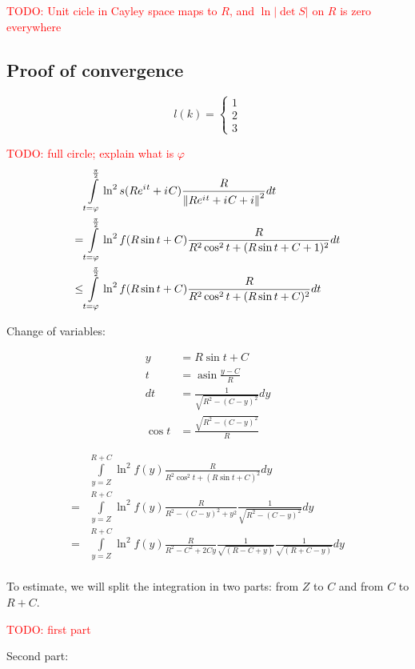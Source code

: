 \documentclass[12pt, a4paper]{article}
\newcommand{\abs}[1]{\left| #1 \right|}
\newcommand{\norm}[1]{\left\lVert #1 \right\rVert}
\newcommand{\eexp}[1]{e^{#1}}
\newcommand{\iu}{{i\mkern1mu}}
\renewcommand{\phi}{\varphi}
\newcommand{\todo}[1]{{\large \textcolor{red}{TODO: #1}}}
\DeclareMathOperator\asin{asin}
\begin{document}
\todo{Unit cicle in Cayley space maps to $R$, and $\ln\abs{\det S}$ on $R$ is zero everywhere}

\subsection*{Proof of convergence}

\[
l(k) =
\begin{cases}
1 \\
2 \\
3 
\end{cases}
\]


\todo{full circle; explain what is $\phi$}
\begin{align*}
    & \int\limits_{t = \phi}^{\frac{\pi}{2}} \ln^2 s(R \eexp{\iu t} + \iu C) \frac{R}{\norm{R \eexp{\iu t} + \iu C + i}^2} dt\\
=   & \int\limits_{t = \phi}^{\frac{\pi}{2}} \ln^2 f(R \sin t + C) \frac{R}{R^2 \cos^2 t + (R \sin t + C + 1)^2} dt\\
\le & \int\limits_{t = \phi}^{\frac{\pi}{2}} \ln^2 f(R \sin t + C) \frac{R}{R^2 \cos^2 t + (R \sin t + C)^2} dt\\
\end{align*}


Change of variables:

\begin{align*}
y &= R \sin t + C \\
t &= \asin \frac{y - C}{R} \\
dt &= \frac{1}{\sqrt{R^2 - (C - y)^2}} dy \\
\cos t &= \frac{\sqrt{R^2 - (C - y)^2}}{R}
\end{align*}


\begin{align*}
    & \int\limits_{y = Z}^{R + C} \ln^2 f(y) \frac{R}{R^2 \cos^2 t + (R \sin t + C)^2} dy \\
=   & \int\limits_{y = Z}^{R + C} \ln^2 f(y) \frac{R}{R^2 - (C - y)^2 + y^2} \frac{1}{\sqrt{R^2 - (C - y)^2}} dy\\
=   & \int\limits_{y = Z}^{R + C} \ln^2 f(y) \frac{R}{R^2 - C^2 + 2 C y} \frac{1}{\sqrt{(R - C + y)}} \frac{1}{\sqrt{(R + C - y)}} dy\\
\end{align*}

To estimate, we will split the integration in two parts: from $Z$ to $C$ and from $C$ to $R + C$.

\todo{first part}

Second part:
\end{document}
